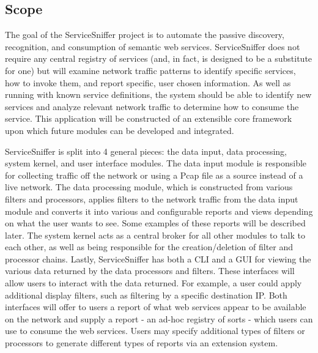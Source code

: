 \documentclass[titlepage]{article}
\begin{document}

\subsection{Scope
    \label{scope}
}

The goal of the ServiceSniffer project is to automate the passive discovery,
recognition, and consumption of semantic web services.  ServiceSniffer does not
require any central registry of services (and, in fact, is designed to be a
substitute for one) but will examine network traffic patterns to identify
specific services, how to invoke them, and report specific, user chosen
information.  As well as running with known service definitions, the system
should be able to identify new services and analyze relevant network traffic to
determine how to consume the service.  This application will be constructed of
an extensible core framework upon which future modules can be developed and
integrated.

ServiceSniffer is split into 4 general pieces: the data input, data processing,
system kernel, and user interface modules.  The data input module is
responsible for collecting traffic off the network or using a Pcap file as a
source instead of a live network.  The data processing module, which is
constructed from various filters and processors, applies filters to the network
traffic from the data input module and converts it into various and
configurable reports and views depending on what the user wants to see.  Some
examples of these reports will be described later.  The system kernel acts as a
central broker for all other modules to talk to each other, as well as being
responsible for the creation/deletion of filter and processor chains.  Lastly,
ServiceSniffer has both a CLI and a GUI for viewing the various data returned
by the data processors and filters.  These interfaces will allow users to
interact with the data returned.  For example, a user could apply additional
display filters, such as filtering by a specific destination IP.  Both
interfaces will offer to users a report of what web services appear to be
available on the network and supply a report - an ad-hoc registry of sorts -
which users can use to consume the web services.  Users may specify additional
types of filters or processors to generate different types of reports via an
extension system.

\end{document}
